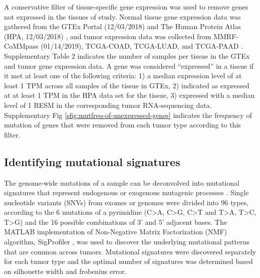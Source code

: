 \documentclass[english, 12pt, letterpaper]{article}
\begin{document}
A conservative filter of tissue-specific gene expression was used to remove genes not expressed in the tissues of study. 
Normal tissue gene expression data was gathered from the GTEx Portal (12/03/2018) \cite{GTExConsortium2017} and The Human Protein Atlas (HPA, 12/03/2018) \cite{Uhlen2015, Uhlen2016}, and tumor expression data was collected from MMRF-CoMMpass (01/14/2019), TCGA-COAD, TCGA-LUAD, and TCGA-PAAD \cite{CancerGenomeAtlasNetwork2012, CancerGenomeAtlasResearchNetwork2014, CancerGenomeAtlasResearchNetwork.Electronicaddress:andrew_aguirredfci.harvard.edu2017}. 
Supplementary Table 2 indicates the number of samples per tissue in the GTEx and tumor gene expression data. 
A gene was considered “expressed” in a tissue if it met at least one of the following criteria: 1) a median expression level of at least 1 TPM across all samples of the tissue in GTEx, 2) indicated as expressed at at least 1 TPM in the HPA data set for the tissue, 3) expressed with a median level of 1 RESM in the corresponding tumor RNA-sequencing data.
Supplementary Fig \ref{sfig:mutfreq-of-unexpressed-genes} indicates the frequency of mutation of genes that were removed from each tumor type according to this filter.


\subsection*{Identifying mutational signatures}

The genome-wide mutations of a sample can be deconvolved into mutational signatures that represent endogenous or exogenous mutagenic processes \cite{Alexandrov2013}. 
Single nucleotide variants (SNVs) from exomes or genomes were divided into 96 types, according to the 6 mutations of a pyrimidine (C>A, C>G, C>T and T>A, T>C, T>G) and the 16 possible combinations of 3’ and 5’ adjacent bases.
The MATLAB implementation of Non-Negative Matrix Factorization (NMF) algorithm, SigProfiler \cite{Alexandrov2013}, was used to discover the underlying mutational patterns that are common across tumors. 
Mutational signatures were discovered separately for each tumor type and the optimal number of signatures was determined based on silhouette width and frobenius error. 
\end{document}
